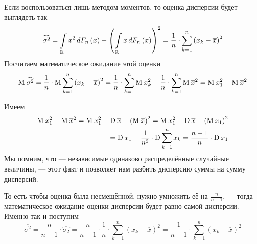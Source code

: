 Если воспользоваться лишь методом моментов, то оценка дисперсии будет выглядеть
так
\begin{equation*}
  \widehat{\sigma^2}
  = \integrall{\mathbb{R}}{dF_n\left( x \right)}{x^2}
    - \left( \integrall{\mathbb{R}}{dF_n\left( x \right)}{x} \right)^2
  = \frac{1}{n} \cdot \sum_{k=1}^n \left( x_k-\overline{x} \right)^2
\end{equation*}
Посчитаем математическое ожидание этой оценки
\begin{equation*}
  \mean{\widehat{\sigma^2}}
  = \frac{1}{n} \cdot \mean{\sum_{k=1}^n \left( x_k-\overline{x} \right)^2}
  = \frac{1}{n} \cdot \sum_{k=1}^{n} \mean{x_k^2}
    - \frac{1}{n} \cdot \sum_{k=1}^{n} \mean{\overline{x}^2}
  = \mean{x_1^2} - \mean{\overline{x}^2}
\end{equation*}
\begin{comment}
Введём дисперсию выборочного среднего, чтобы легче считалось
\begin{equation*}
  \mean{x_1^2} - \mean{\overline{x}^2}
  = \mean{x_1^2} - \dispersion{\overline{x}}
    - \left( \mean{\overline{x}} \right)^2
  = \mean{x_1^2} - \dispersion{\overline{x}} - \left( \mean{x_1} \right)^2
\end{equation*}
Дальше выделяем дисперсию $x_1$ и смотрим, что получается
\begin{equation*}
  \mean{x_1^2} - \dispersion{\overline{x}} - \left( \mean{x_1} \right)^2
  = \dispersion{x_1} - \frac{1}{n^2} \cdot \dispersion{\sum_{k=1}^{n} x_k}
  = \frac{n-1}{n} \cdot \dispersion{x_1}
\end{equation*}
\end{comment}
Имеем
\begin{equation*}
  \begin{split}
    \mean{x_1^2} - \mean{\overline{x}^2}
    = \mean{x_1^2} - \dispersion{\overline{x}}
      - \left( \mean{\overline{x}} \right)^2
    = \mean{x_1^2} - \dispersion{\overline{x}} - \left( \mean{x_1} \right)^2\\
    = \dispersion{x_1} - \frac{1}{n^2} \cdot \dispersion{\sum_{k=1}^{n} x_k}
    = \frac{n-1}{n} \cdot \dispersion{x_1}
  \end{split}
\end{equation*}
Мы помним, что \xsample --- независимые одинаково распределённые случайные
величины, --- этот факт и позволяет нам разбить дисперсию суммы на сумму
дисперсий.

То есть чтобы оценка была несмещённой, нужно умножить её на $\frac{n}{n-1}$,
--- тогда математическое ожидание оценки дисперсии будет равно самой дисперсии.
Именно так и поступим
\begin{equation*}
  \overline{\sigma^2}
  = \frac{n}{n-1} \cdot \widehat{\sigma_2}
  = \frac{n}{n-1} \cdot \frac{1}{n}
    \cdot \sum_{k=1}^n \left( x_k-\overline{x} \right)^2
  = \frac{1}{n-1} \cdot \sum_{k=1}^n \left( x_k-\overline{x} \right)^2
\end{equation*}

